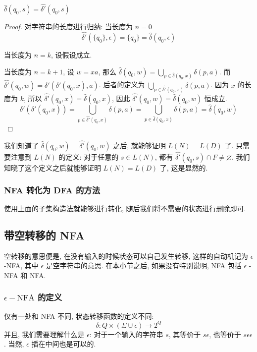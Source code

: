 \documentclass[../main.tex]{subfiles}
\begin{document}
\begin{thm}
\( \hat{\delta}(q_{0},s) = \hat{\delta'}(q_{0}, s)\)
\end{thm}
\begin{proof}
对字符串的长度进行归纳:
当长度为 \(n=0\)
\begin{equation}
\hat{\delta'} (\{q_{0}\}, \epsilon ) = \{q_{0} \}  = \hat{\delta} (q_{0}, \epsilon) 
\end{equation}

当长度为 \(n = k\), 设假设成立.

当长度为 \(n  = k  + 1\), 设 \(w = x a \), 那么 \( \hat{\delta} (q_{0}, w ) = \bigcup_{p \in \hat{\delta} (q_{0}, x) } \delta (p, a)\). 
而 \( \hat{\delta'} (q_{0}, w) = \delta'  (\delta' (q_{0}, x), a)\). 后者的定义为 \(\bigcup_{p \in \hat{\delta'}(q_{0}, x)} \delta(p, a)\). 
因为 \(x\) 的长度为 \(k\), 所以 \( \hat{\delta' } (q_{0}, x) = \hat{\delta} (q_{0}, x)\), 因此 \( \hat{\delta ' } (q_{0}, w) = \hat{\delta} (q_{0}, w) \) 恒成立. 
\begin{equation}
\delta ' (\delta' (q_{0}, x)) = \bigcup_{p \in \hat{\delta'} (q_{0}, x )} 
\delta (p, a ) = \bigcup_{p \in \hat{\delta} (q _{0}, x) } \delta (p, a ) = \hat{\delta} (q_{0}, w) 
\end{equation}
\end{proof}
我们知道了 \( \hat{\delta} (q_{0}, w )  = \hat{\delta ' } (q_{0}, w )\) 之后, 就能够证明 \(L (N) = L(D)\) 了. 只需要注意到 \(L (N)\) 的定义: 对于任意的 \(s \in L (N)\), 都有 \( \hat{\delta' } (q_{0}, s) \cap F \ne \varnothing \). 我们知晓了这个定义之后就能够证明 \(L (N) = L (D)\) 了, 这是显然的. 

\subsubsection{NFA 转化为 DFA 的方法}
使用上面的子集构造法就能够进行转化, 随后我们将不需要的状态进行删除即可. 
\subsection{带空转移的 NFA}
空转移的意思便是, 在没有输入的时候状态可以自己发生转移, 这样的自动机记为 \(\epsilon\)-NFA, 其中 \(\epsilon\) 是空字符串的意思. 在本小节之后, 如果没有特别说明, NFA 包括 \(\epsilon\) - NFA 和 NFA. 
\subsubsection{\(\epsilon-\text{NFA}\) 的定义}
仅有一处和 NFA 不同, 状态转移函数的定义不同: 
\begin{equation}
\delta \colon Q \times (\Sigma \cup \epsilon ) \to 2 ^{Q}
\end{equation}
并且, 我们需要理解什么是 \(\epsilon\): 对于一个输入的字符串 \(s\), 其等价于 \(s\epsilon\), 也等价于 \(s\epsilon\epsilon\). 当然, \(\epsilon\) 插在中间也是可以的.
\end{document}
